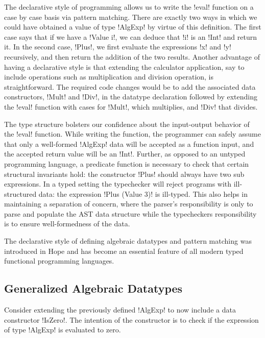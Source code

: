 \documentclass[screen,nonacm,manuscript,review]{acmart} %
\begin{document}
The declarative style of programming allows us to write the !eval!
function on a case by case basis via pattern
matching. There are exactly two ways in which we could have obtained a
value of type !AlgExp! by virtue of this definition. The first case says
that if we have a !Value i!, we can deduce that
!i! is an !Int! and return it. In the second case, !Plus!, we first
evaluate the expressions !x! and !y! recursively, and then return the
addition of the two results. Another advantage of having a declarative
style is that extending the calculator application, say to include
operations such as multiplication and division operation, is
straightforward. The required code changes would be to add the
associated data constructors, !Mult! and !Div!, in the datatype
declaration followed by extending the !eval! function with cases for
!Mult!, which multiplies, and !Div! that divides.

The type structure bolsters our confidence
about the input-output behavior of the !eval! function. While writing
the function, the programmer can safely assume that only a well-formed
!AlgExp! data will be accepted as a function input, and the accepted
return value will be an !Int!. Further, as opposed to an untyped
programming language, a predicate function is necessary to check that certain
structural invariants hold: the constructor !Plus! should always have
two sub expressions. In a typed setting the typechecker will reject programs
with ill-structured data: the expression !Plus (Value 3)! is
ill-typed. This also helps in maintaining a separation of concern,
where the parser's responsibility is only to parse and populate the
AST data structure while the typecheckers responsibility is to ensure
well-formedness of the data.

The declarative style of defining algebraic datatypes and pattern matching was introduced in
Hope\cite{burstall_proving_1969, burstall_hope_1980} and has become an
essential feature of all modern typed functional programming languages.

\subsection{Generalized Algebraic Datatypes}
Consider extending the previously defined !AlgExp! to now
include a data constructor !IsZero!. The intention of the constructor is to
check if the expression of type !AlgExp! is evaluated to zero.
\end{document}
